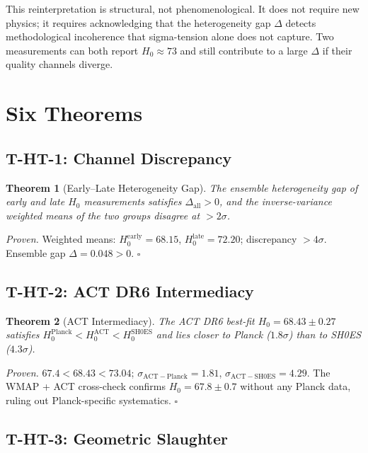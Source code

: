 \documentclass[
  aps,
  prd,
  twocolumn,
  superscriptaddress,
  nofootinbib,
  floatfix
]{revtex4-2}
\newtheorem{theorem}{Theorem}
\newcommand{\hetgap}{\Delta}
\begin{document}
This reinterpretation is structural, not phenomenological.
It does not require new physics; it requires acknowledging that
the heterogeneity gap $\hetgap$ detects methodological incoherence
that sigma-tension alone does not capture.
Two measurements can both report $H_0 \approx 73$ and still contribute
to a large $\hetgap$ if their quality channels diverge.

\section{Six Theorems}\label{sec:theorems}

\subsection{T-HT-1: Channel Discrepancy}

\begin{theorem}[Early--Late Heterogeneity Gap]\label{thm:T1}
The ensemble heterogeneity gap of early and late $H_0$
measurements satisfies $\hetgap_{\mathrm{all}} > 0$,
and the inverse-variance weighted means of the two groups
disagree at $> 2\sigma$.
\end{theorem}

\noindent\textit{Proven.}
Weighted means: $H_0^{\mathrm{early}} = 68.15$,
$H_0^{\mathrm{late}} = 72.20$; discrepancy $> 4\sigma$.
Ensemble gap $\hetgap = 0.048 > 0$.  \hfill$\square$

\subsection{T-HT-2: ACT DR6 Intermediacy}

\begin{theorem}[ACT Intermediacy]\label{thm:T2}
The ACT DR6 best-fit $H_0 = 68.43 \pm 0.27$ satisfies
$H_0^{\mathrm{Planck}} < H_0^{\mathrm{ACT}} < H_0^{\mathrm{SH0ES}}$
and lies closer to Planck ($1.8\sigma$) than to SH0ES ($4.3\sigma$).
\end{theorem}

\noindent\textit{Proven.}
$67.4 < 68.43 < 73.04$; $\sigma_{\mathrm{ACT{-}Planck}} = 1.81$,
$\sigma_{\mathrm{ACT{-}SH0ES}} = 4.29$.
The WMAP + ACT cross-check confirms $H_0 = 67.8 \pm 0.7$ without
any Planck data, ruling out Planck-specific systematics.  \hfill$\square$

\subsection{T-HT-3: Geometric Slaughter}
\end{document}
